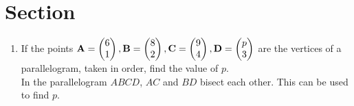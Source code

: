 \documentclass[journal,12pt,twocolumn]{IEEEtran}
\renewcommand\thesection{\arabic{section}}
\begin{document}
\section{Section}
\renewcommand{\theequation}{\theenumi}
\begin{enumerate}[label=\thesection.\arabic*.,ref=\thesection.\theenumi]


\item If the points
$
\mathbf{A} = \begin{pmatrix}6\\1\end{pmatrix}, 
\mathbf{B} = \begin{pmatrix}8\\2\end{pmatrix}, 
\mathbf{C} = \begin{pmatrix}9\\4\end{pmatrix}, 
\mathbf{D} = \begin{pmatrix}p\\3\end{pmatrix}
$
are the vertices of a parallelogram, taken in order, find the value of $p$.
\\
\solution In the parallelogram $ABCD$, $AC$ and $BD$ bisect each other.  This can be used to find $p$.


\end{enumerate}
\end{document}
